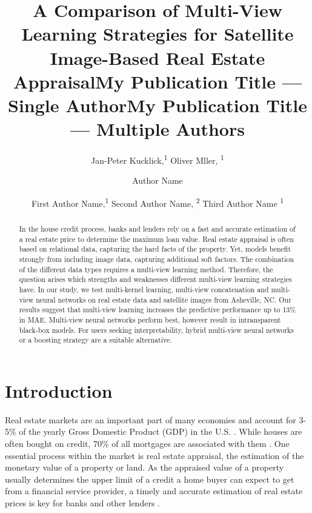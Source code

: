 \documentclass[letterpaper]{article} %
\title{A Comparison of Multi-View Learning Strategies for Satellite Image-Based Real Estate Appraisal}
\author{
Jan-Peter Kucklick,\textsuperscript{\rm 1}
Oliver Mller, \textsuperscript{\rm 1}
\\
}
\title{My Publication Title --- Single Author}
\author {
Author Name \\
}
\title{My Publication Title --- Multiple Authors}
\author {
First Author Name,\textsuperscript{\rm 1}
Second Author Name, \textsuperscript{\rm 2}
Third Author Name \textsuperscript{\rm 1} \\
}
\begin{document}
\maketitle

\begin{abstract}
In the house credit process, banks and lenders rely on a fast and accurate estimation of a real estate price to determine the maximum loan value. Real estate appraisal is often based on relational data, capturing the hard facts of the property. Yet, models benefit strongly from including image data, capturing additional soft factors. The combination of the different data types requires a multi-view learning method. Therefore, the question arises which strengths and weaknesses different multi-view learning strategies have. In our study, we test multi-kernel learning, multi-view concatenation and multi-view neural networks on real estate data and satellite images from Asheville, NC. Our results suggest that multi-view learning increases the predictive performance up to 13\% in MAE. Multi-view neural networks perform best, however result in intransparent black-box models. For users seeking interpretability, hybrid multi-view neural networks or a boosting strategy are a suitable alternative.
\end{abstract}

\section{Introduction}
Real estate markets are an important part of many economies and account for 3-5\% of the yearly Gross Domestic Product (GDP)  in the U.S. \cite{nahb}. While houses are often bought on credit, 70\% of all mortgages are associated with them \cite{stupak}. One essential process within the market is real estate appraisal, the estimation of the monetary value of a property or land. As the appraised value of a property usually determines the upper limit of a credit a home buyer can expect to get from a financial service provider, a timely and accurate estimation of real estate prices is key for banks and other lenders \cite{liu2018learning}.
\end{document}
